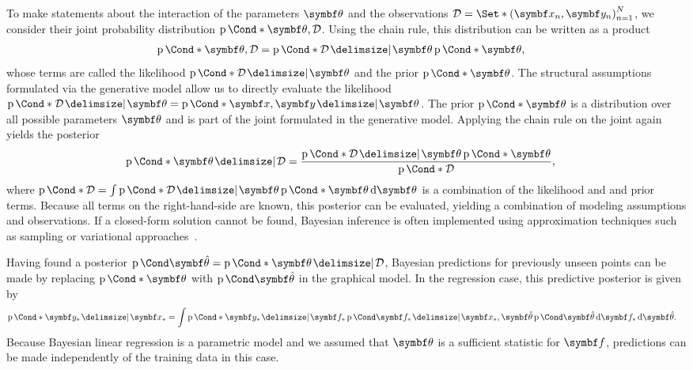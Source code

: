 To make statements about the interaction of the parameters $\mat{\theta}$ and the observations $\Dc = \Set*{(\mat{x}_n, \mat{y}_n)}_{n=1}^N$, we consider their joint probability distribution $\Prob*{\mat{\theta}, \Dc}$.
Using the chain rule, this distribution can be written as a product
\begin{align}
    \Prob*{\mat{\theta}, \Dc} & = \Prob*{\Dc \given \mat{\theta}}\Prob*{\mat{\theta}},
\end{align}
whose terms are called the likelihood $\Prob*{\Dc \given \mat{\theta}}$ and the prior $\Prob*{\mat{\theta}}$.
The structural assumptions formulated via the generative model allow us to directly evaluate the likelihood $\Prob*{\Dc \given \mat{\theta}} = \Prob*{\mat{x}, \mat{y} \given \mat{\theta}}$.
The prior $\Prob*{\mat{\theta}}$ is a distribution over all possible parameters $\mat{\theta}$ and is part of the joint formulated in the generative model.
Applying the chain rule on the joint again yields the posterior
\begin{align}
    \Prob*{\mat{\theta} \given \Dc}
     & = \frac{\Prob*{\Dc \given \mat{\theta}}\Prob*{\mat{\theta}}}{\Prob*{\Dc}},
\end{align}
where $\Prob*{\Dc} = \int \Prob*{\Dc \given \mat{\theta}} \Prob*{\mat{\theta}} \diff \mat{\theta}$ is a combination of the likelihood and and prior terms.
Because all terms on the right-hand-side are known, this posterior can be evaluated, yielding a combination of modeling assumptions and observations.
If a closed-form solution cannot be found, Bayesian inference is often implemented using approximation techniques such as sampling or variational approaches~\parencite{bishop_pattern_2007}.

Having found a posterior $\Prob{\mat{\hat{\theta}}} = \Prob*{\mat{\theta} \given \Dc}$, Bayesian predictions for previously unseen points can be made by replacing $\Prob*{\mat{\theta}}$ with $\Prob{\mat{\hat{\theta}}}$ in the graphical model.
In the regression case, this predictive posterior is given by
\begin{align}
    \Prob*{\mat{y}_\ast \given \mat{x}_\ast} & = \int \Prob*{\mat{y}_\ast \given \mat{f}_\ast} \Prob{\mat{f}_\ast \given \mat{x}_\ast, \mat{\hat{\theta}}} \Prob{\mat{\hat{\theta}}} \diff \mat{f}_\ast \diff \mat{\hat{\theta}}.
\end{align}
Because Bayesian linear regression is a parametric model and we assumed that $\mat{\theta}$ is a sufficient statistic for $\mat{f}$, predictions can be made independently of the training data in this case.

